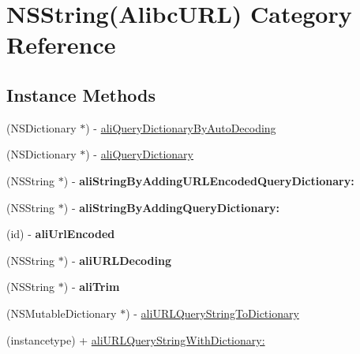 \hypertarget{category_n_s_string_07_alibc_u_r_l_08}{}\section{N\+S\+String(Alibc\+U\+RL) Category Reference}
\label{category_n_s_string_07_alibc_u_r_l_08}
\subsection*{Instance Methods}
\begin{DoxyCompactItemize}
\item 
(N\+S\+Dictionary $\ast$) -\/ \mbox{\hyperlink{category_n_s_string_07_alibc_u_r_l_08_a60e71519bb8bce444bdd3847dc65c9eb}{ali\+Query\+Dictionary\+By\+Auto\+Decoding}}
\item 
(N\+S\+Dictionary $\ast$) -\/ \mbox{\hyperlink{category_n_s_string_07_alibc_u_r_l_08_a48143e9d7a6dfe9e09309159050b7775}{ali\+Query\+Dictionary}}
\item 
\mbox{\label{category_n_s_string_07_alibc_u_r_l_08_a5a2544dd5ce1176fab715079aff848ad}} 
(N\+S\+String $\ast$) -\/ {\bfseries ali\+String\+By\+Adding\+U\+R\+L\+Encoded\+Query\+Dictionary\+:}
\item 
\mbox{\label{category_n_s_string_07_alibc_u_r_l_08_a06e794f9e5cb039723ea53c6c8d6eb20}} 
(N\+S\+String $\ast$) -\/ {\bfseries ali\+String\+By\+Adding\+Query\+Dictionary\+:}
\item 
\mbox{\label{category_n_s_string_07_alibc_u_r_l_08_a56d688de5fa1c63b7dc2fe939fc4e38d}} 
(id) -\/ {\bfseries ali\+Url\+Encoded}
\item 
\mbox{\label{category_n_s_string_07_alibc_u_r_l_08_adcb20db9bb3d07207b823a04c1301f08}} 
(N\+S\+String $\ast$) -\/ {\bfseries ali\+U\+R\+L\+Decoding}
\item 
\mbox{\label{category_n_s_string_07_alibc_u_r_l_08_a7e9b6db2c04307ecb9daabb07577e4ad}} 
(N\+S\+String $\ast$) -\/ {\bfseries ali\+Trim}
\end{DoxyCompactItemize}
\begin{DoxyCompactItemize}
\item 
(N\+S\+Mutable\+Dictionary $\ast$) -\/ \mbox{\hyperlink{category_n_s_string_07_alibc_u_r_l_08_ac6c5c3cd01940e5f3fd6a796ae1f392e}{ali\+U\+R\+L\+Query\+String\+To\+Dictionary}}
\item 
(instancetype) + \mbox{\hyperlink{category_n_s_string_07_alibc_u_r_l_08_ad1e52926288baf29ab9d4c137202d6a2}{ali\+U\+R\+L\+Query\+String\+With\+Dictionary\+:}}
\end{DoxyCompactItemize}


